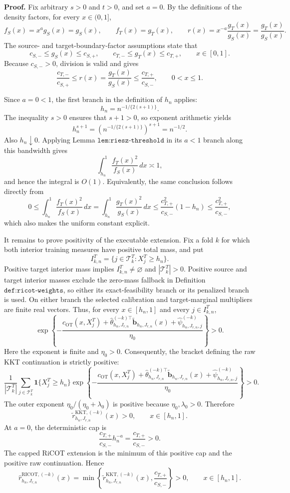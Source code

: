 \textbf{Proof.}
Fix arbitrary \(s>0\) and \(t>0\), and set \(a=0\).  By the definitions of the density factors, for every \(x\in(0,1]\),
\[
 f_S(x)=x^a g_S(x)=g_S(x),
 \qquad
 f_T(x)=g_T(x),
 \qquad
 r(x)=x^{-a}\frac{g_T(x)}{g_S(x)}=\frac{g_T(x)}{g_S(x)}.
\]
The source- and target-boundary-factor assumptions state that
\[
 c_{S,-}\le g_S(x)\le c_{S,+},
 \qquad
 c_{T,-}\le g_T(x)\le c_{T,+},
 \qquad x\in[0,1].
\]
Because \(c_{S,-}>0\), division is valid and gives
\[
 \frac{c_{T,-}}{c_{S,+}}
 \le r(x)=\frac{g_T(x)}{g_S(x)}
 \le \frac{c_{T,+}}{c_{S,-}},
 \qquad 0<x\le1.
\]

Since \(a=0<1\), the first branch in the definition of \(h_n\) applies:
\[
 h_n=n^{-1/\{2(s+1)\}}.
\]
The inequality \(s>0\) ensures that \(s+1>0\), so exponent arithmetic yields
\[
 h_n^{s+1}
 =\left(n^{-1/\{2(s+1)\}}\right)^{s+1}
 =n^{-1/2}.
\]
Also \(h_n\downarrow0\).  Applying Lemma \(\texttt{lem:riesz-threshold}\) in its \(a<1\) branch along this bandwidth gives
\[
 \int_{h_n}^1\frac{f_T(x)^2}{f_S(x)}\,dx\asymp1,
\]
and hence the integral is \(O(1)\).  Equivalently, the same conclusion follows directly from
\[
 0\le \int_{h_n}^1\frac{f_T(x)^2}{f_S(x)}\,dx
 =\int_{h_n}^1\frac{g_T(x)^2}{g_S(x)}\,dx
 \le \frac{c_{T,+}^2}{c_{S,-}}(1-h_n)
 \le \frac{c_{T,+}^2}{c_{S,-}},
\]
which also makes the uniform constant explicit.

It remains to prove positivity of the executable extension.  Fix a fold \(k\) for which both interior training measures have positive total mass, and put
\[
 I^T_{k,n}=\{j\in\mathcal T^T_k:X_j^T\ge h_n\}.
\]
Positive target interior mass implies \(I^T_{k,n}\ne\varnothing\) and \(|\mathcal T^T_k|>0\).  Positive source and target interior masses exclude the zero-mass fallback in Definition \(\texttt{def:ricot-weights}\), so either its exact-feasibility branch or its penalized branch is used.  On either branch the selected calibration and target-marginal multipliers are finite real vectors.  Thus, for every \(x\in[h_n,1]\) and every \(j\in I^T_{k,n}\),
\[
 \exp\!\left\{-\frac{
 c_{\mathrm{OT}}(x,X_j^T)
 +\widehat\theta_{h_n,J_{r,n}}^{(-k)\top}
 \widetilde{\mathbf b}_{h_n,J_{r,n}}(x)
 +\widehat\psi^{(-k)}_{h_n,J_{r,n},j}}
 {\eta_0}\right\}>0.
\]
Here the exponent is finite and \(\eta_0>0\).  Consequently, the bracket defining the raw KKT continuation is strictly positive:
\[
 \frac1{|\mathcal T^T_k|}
 \sum_{j\in\mathcal T^T_k}
 \mathbf 1\{X_j^T\ge h_n\}
 \exp\!\left\{-\frac{
 c_{\mathrm{OT}}(x,X_j^T)
 +\widehat\theta_{h_n,J_{r,n}}^{(-k)\top}
 \widetilde{\mathbf b}_{h_n,J_{r,n}}(x)
 +\widehat\psi^{(-k)}_{h_n,J_{r,n},j}}
 {\eta_0}\right\}>0.
\]
The outer exponent \(\eta_0/(\eta_0+\lambda_0)\) is positive because \(\eta_0,\lambda_0>0\).  Therefore
\[
 \widetilde r^{\mathrm{KKT},(-k)}_{h_n,J_{r,n}}(x)>0,
 \qquad x\in[h_n,1].
\]
At \(a=0\), the deterministic cap is
\[
 \frac{c_{T,+}}{c_{S,-}}h_n^{-a}
 =\frac{c_{T,+}}{c_{S,-}}>0.
\]
The capped RiCOT extension is the minimum of this positive cap and the positive raw continuation.  Hence
\[
 \widehat r^{\mathrm{RICOT},(-k)}_{h_n,J_{r,n}}(x)
 =\min\!\left\{
 \widetilde r^{\mathrm{KKT},(-k)}_{h_n,J_{r,n}}(x),
 \frac{c_{T,+}}{c_{S,-}}
 \right\}>0,
 \qquad x\in[h_n,1].
\]

